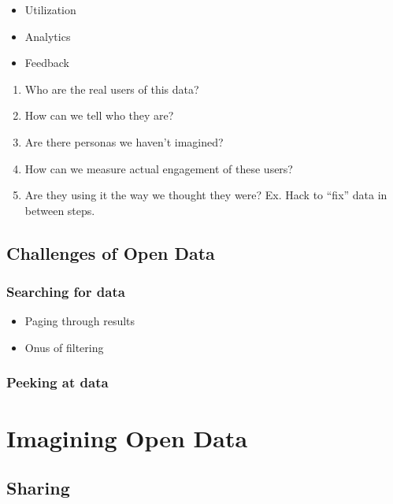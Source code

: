 \documentclass[
  openany]{book}
\providecommand{\tightlist}{%
  \setlength{\itemsep}{0pt}\setlength{\parskip}{0pt}}
\begin{document}
\begin{itemize}
\tightlist
\item
  Utilization
\item
  Analytics
\item
  Feedback
\end{itemize}

\begin{enumerate}
\def\labelenumi{\arabic{enumi}.}
\tightlist
\item
  Who are the real users of this data?
\item
  How can we tell who they are?
\item
  Are there personas we haven't imagined?
\item
  How can we measure actual engagement of these users?
\item
  Are they using it the way we thought they were? Ex. Hack to ``fix'' data in between steps.
\end{enumerate}

\hypertarget{challenges-of-open-data}{%
\section{Challenges of Open Data}\label{challenges-of-open-data}}

\hypertarget{searching-for-data}{%
\subsection{Searching for data}\label{searching-for-data}}

\begin{itemize}
\tightlist
\item
  Paging through results
\item
  Onus of filtering
\end{itemize}

\hypertarget{peeking-at-data}{%
\subsection{Peeking at data}\label{peeking-at-data}}

\hypertarget{imagine}{%
\chapter{Imagining Open Data}\label{imagine}}

\hypertarget{sharing}{%
\section{Sharing}\label{sharing}}
\end{document}
